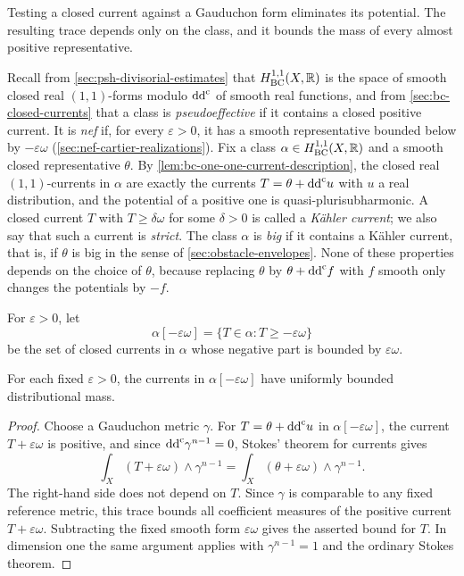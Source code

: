 Testing a closed current against a Gauduchon form eliminates its potential. The resulting trace depends only on the class, and it bounds the mass of every almost positive representative.

Recall from \cref{sec:psh-divisorial-estimates} that $H^{1,1}_{\mathrm{BC}}(X,\mathbb R)$ is the space of smooth closed real $(1,1)$-forms modulo $\mathrm{dd}^{\mathrm{c}}$ of smooth real functions, and from \cref{sec:bc-closed-currents} that a class is \emph{pseudoeffective} if it contains a closed positive current. It is \emph{nef} if, for every $\varepsilon>0$, it has a smooth representative bounded below by $-\varepsilon\omega$ (\cref{sec:nef-cartier-realizations}). Fix a class $\alpha\in H^{1,1}_{\mathrm{BC}}(X,\mathbb R)$ and a smooth closed representative $\theta$. By \cref{lem:bc-one-one-current-description}, the closed real $(1,1)$-currents in $\alpha$ are exactly the currents $T=\theta+\mathrm{dd}^{\mathrm{c}} u$ with $u$ a real distribution, and the potential of a positive one is quasi-plurisubharmonic. A closed current $T$ with $T\geq\delta\omega$ for some $\delta>0$ is called a \emph{K\"ahler current}; we also say that such a current is \emph{strict}. The class $\alpha$ is \emph{big} if it contains a K\"ahler current, that is, if $\theta$ is big in the sense of \cref{sec:obstacle-envelopes}. None of these properties depends on the choice of $\theta$, because replacing $\theta$ by $\theta+\mathrm{dd}^{\mathrm{c}} f$ with $f$ smooth only changes the potentials by $-f$.

For $\varepsilon>0$, let
\[
 \alpha[-\varepsilon\omega]
 =\{T\in\alpha:T\geq-\varepsilon\omega\}
\]
be the set of closed currents in $\alpha$ whose negative part is bounded by $\varepsilon\omega$.
\begin{proposition}\label{prop:bc-gauduchon-compactness}
For each fixed $\varepsilon>0$, the currents in $\alpha[-\varepsilon\omega]$ have uniformly bounded distributional mass.
\end{proposition}
\begin{proof}
Choose a Gauduchon metric $\gamma$. For $T=\theta+\mathrm{dd}^{\mathrm{c}} u$ in $\alpha[-\varepsilon\omega]$, the current $T+\varepsilon\omega$ is positive, and since $\mathrm{dd}^{\mathrm{c}}\gamma^{n-1}=0$, Stokes' theorem for currents gives
\[
 \int_X(T+\varepsilon\omega)\wedge\gamma^{n-1}
 =\int_X(\theta+\varepsilon\omega)\wedge\gamma^{n-1}.
\]
The right-hand side does not depend on $T$. Since $\gamma$ is comparable to any fixed reference metric, this trace bounds all coefficient measures of the positive current $T+\varepsilon\omega$. Subtracting the fixed smooth form $\varepsilon\omega$ gives the asserted bound for $T$. In dimension one the same argument applies with $\gamma^{n-1}=1$ and the ordinary Stokes theorem.
\end{proof}

